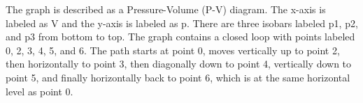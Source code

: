 The graph is described as a Pressure-Volume (P-V) diagram. The x-axis is labeled as V and the y-axis is labeled as p. There are three isobars labeled p1, p2, and p3 from bottom to top. The graph contains a closed loop with points labeled 0, 2, 3, 4, 5, and 6. The path starts at point 0, moves vertically up to point 2, then horizontally to point 3, then diagonally down to point 4, vertically down to point 5, and finally horizontally back to point 6, which is at the same horizontal level as point 0.
